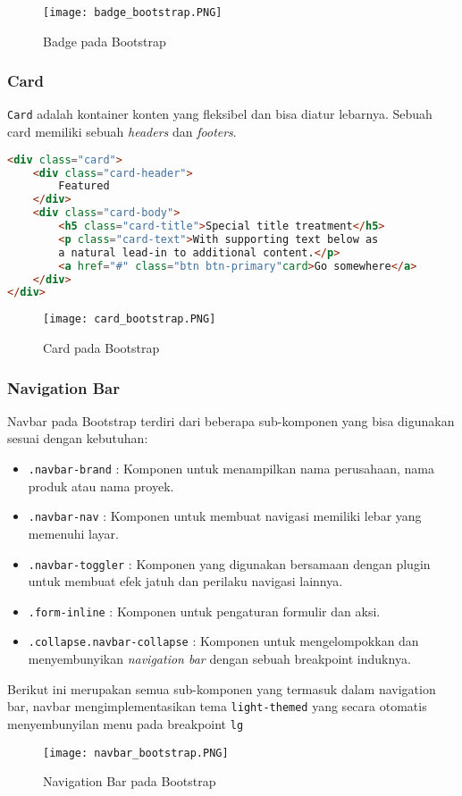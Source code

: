 \begin{itemize}
\begin{figure} [H]
	\centering  
	\texttt{[image: badge\_bootstrap.PNG]}  
	\caption{Badge pada Bootstrap} 
\end{figure}

\subsubsection{Card}
\texttt{Card} adalah kontainer konten yang fleksibel dan bisa diatur lebarnya. Sebuah card memiliki sebuah \textit{headers} dan \textit{footers}.

\begin{lstlisting}[language=HTML, frame=single, basicstyle=\small] 
<div class="card">
	<div class="card-header">
		Featured
	</div>
	<div class="card-body">
		<h5 class="card-title">Special title treatment</h5>
		<p class="card-text">With supporting text below as 
		a natural lead-in to additional content.</p>
		<a href="#" class="btn btn-primary"card>Go somewhere</a>
	</div>
</div>
\end{lstlisting}

\begin{figure} [H]
	\centering  
	\texttt{[image: card\_bootstrap.PNG]}  
	\caption{Card pada Bootstrap} 
\end{figure}

\subsubsection{Navigation Bar}
Navbar pada Bootstrap terdiri dari beberapa sub-komponen yang bisa digunakan sesuai dengan kebutuhan:
\begin{itemize}
    \item \texttt{.navbar-brand} : Komponen untuk menampilkan nama perusahaan, nama produk atau nama proyek.
    \item \texttt{.navbar-nav} : Komponen untuk membuat navigasi memiliki lebar yang memenuhi layar.
    \item \texttt{.navbar-toggler} : Komponen yang digunakan bersamaan dengan plugin untuk membuat efek jatuh dan perilaku navigasi lainnya.
    \item \texttt{.form-inline} : Komponen untuk pengaturan formulir dan aksi.
    \item \texttt{.collapse.navbar-collapse} : Komponen untuk mengelompokkan dan menyembunyikan \textit{navigation bar} dengan sebuah breakpoint induknya.
\end{itemize}
Berikut ini merupakan semua sub-komponen yang termasuk dalam navigation bar, navbar mengimplementasikan tema \texttt{light-themed} yang secara otomatis menyembunyilan menu pada breakpoint \texttt{lg}
\begin{figure} [H]
	\centering  
	\texttt{[image: navbar\_bootstrap.PNG]}  
	\caption{Navigation Bar pada Bootstrap} 
\end{figure}


\end{itemize}
